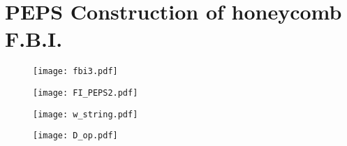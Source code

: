 
\section{PEPS Construction of honeycomb F.B.I.}
\begin{figure}[H]
	\centering
	\texttt{[image: fbi3.pdf]}
\end{figure}

\begin{figure}[H]
	\centering
	\texttt{[image: FI\_PEPS2.pdf]}
\end{figure}

\begin{figure}[H]
	\centering
	\texttt{[image: w\_string.pdf]}
\end{figure}

\begin{figure}[H]
	\centering
	\texttt{[image: D\_op.pdf]}
\end{figure}